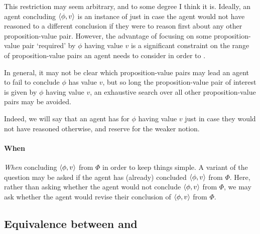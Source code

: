 \begin{note}
  This restriction may seem arbitrary, and to some degree I think it is.
  Ideally, an agent concluding \(\langle \phi, v \rangle\) is an instance of \csN{} just in case the agent would not have reasoned to a different conclusion if they were to reason first about any other proposition-value pair.
  However, the advantage of focusing on some proposition-value pair `required' by \(\phi\) having value \(v\) is a significant constraint on the range of proposition-value pairs an agent needs to consider in order to \csN{}.

  In general, it may not be clear which proposition-value pairs may lead an agent to fail to conclude \(\phi\) has value \(v\), but so long the proposition-value pair of interest is given by \(\phi\) having value \(v\), an exhaustive search over all other proposition-value pairs may be avoided.

  Indeed, we will say that an agent has \emph{\support{}} for \(\phi\) having value \(v\) just in case they would not have reasoned otherwise, and reserve \emph{\claiming{}} \support{} for the weaker notion.
\end{note}

\paragraph*{When}

\begin{note}
  \emph{When} concluding \(\langle \phi, v \rangle\) from \(\Phi\) in order to keep things simple.
  A variant of the question may be asked if the agent has (already) concluded \(\langle \phi, v \rangle\) from \(\Phi\).
  Here, rather than asking whether the agent would not conclude \(\langle \phi, v \rangle\) from \(\Phi\), we may ask whether the agent would revise their conclusion of \(\langle \phi, v \rangle\) from \(\Phi\).
\end{note}

\subsection{Equivalence between \qzS{} and \izetaS{}}
\label{sec:overview:an-equiv-stat-of-zs}

